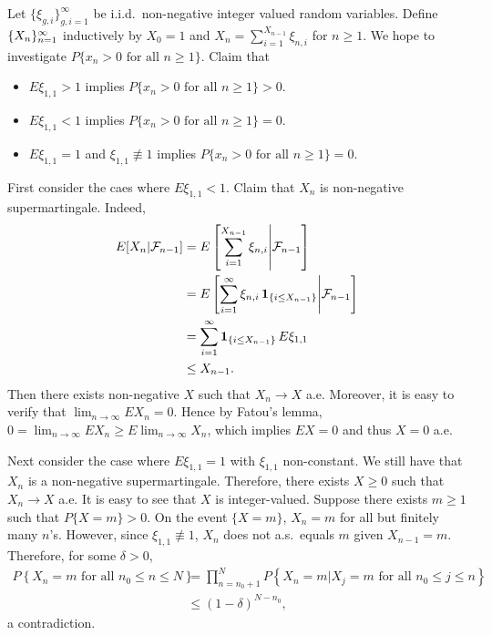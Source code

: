 \documentclass[a4paper]{article}
\begin{document}
\begin{eg}
  \def\tx{\tilde{X}}
  Let $\{ \xi_{g, i} \}_{g, i = 1}^\infty$ be i.i.d.\ non-negative
  integer valued random variables. Define $\{ X_n \}_{n=1}^\infty$ inductively
  by $X_0 = 1$ and $X_n = \sum_{i=1}^{X_{n-1}} \xi_{n, i}$ for $n \geq 1$.
  We hope to investigate $P \{ x_n > 0 \text{ for all $n \geq 1$} \}$.
  Claim that
  \begin{itemize}
    \item $E \xi_{1, 1} > 1$ implies $P \{ x_n > 0 \text{ for all $n \geq 1$} \} > 0$.
    \item $E \xi_{1, 1} < 1$ implies $P \{ x_n > 0 \text{ for all $n \geq 1$} \} = 0$.
    \item $E \xi_{1, 1} = 1$ and $\xi_{1, 1} \not\equiv 1$
          implies $P \{ x_n > 0 \text{ for all $n \geq 1$} \} = 0$.
  \end{itemize}

  First consider the caes where $E \xi_{1, 1} < 1$. Claim that
  $X_n$ is non-negative supermartingale. Indeed,
  \begin{align*}
    E [X_n | \mathcal{F}_{n - 1}]
     & = E \left[ \sum_{i=1}^{X_{n-1}} \xi_{n, i} \middle| \mathcal{F}_{n - 1} \right] \\
     & = E \left[ \sum_{i=1}^\infty \xi_{n, i} \operatorname{\mathbf{1}}_{\{i \leq X_{n - 1}\}}
             \middle| \mathcal{F}_{n - 1} \right]                 \\
     & = \sum_{i=1}^\infty \operatorname{\mathbf{1}}_{\{i \leq X_{n - 1}\}} E \xi_{1, 1}                       \\
     & \leq X_{n - 1}.
  \end{align*}
  Then there exists non-negative $X$ such that $X_n \to X$ a.e.
  Moreover, it is easy to verify that $\lim_{n \to \infty} E X_n = 0$.
  Hence by Fatou's lemma,
  $0 = \lim_{n \to \infty} E X_n \geq E \lim_{n \to \infty} X_n$,
  which implies $E X = 0$ and thus $X = 0$ a.e.

  Next consider the case where $E \xi_{1,1} = 1$ with $\xi_{1,1}$
  non-constant. We still have that $X_n$ is a non-negative
  supermartingale. Therefore, there exists $X \geq 0$ such that
  $X_n \to X$ a.e. It is easy to see that $X$ is integer-valued.
  Suppose there exists $m \geq 1$ such that $P \{ X = m \} > 0$.
  On the event $\{ X = m \}$, $X_n = m$ for all but finitely many $n$'s.
  However, since $\xi_{1,1} \not \equiv 1$, $X_n$ does not
  a.s.\ equals $m$ given $X_{n-1} = m$. Therefore, for
  some $\delta > 0$,
  \begin{align*}
    P \left\{ X_n = m \text{ for all $n_0 \leq n \leq N$} \right\}
     & = \prod_{n = n_0 + 1}^N P \left\{ X_n = m | X_j = m
    \text{ for all $n_0 \leq j \leq n$} \right\}           \\
     & \leq (1 - \delta)^{N - n_0},
  \end{align*}
  a contradiction.


\end{eg}
\end{document}
